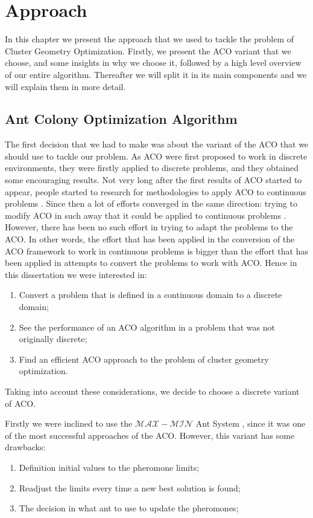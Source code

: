 \chapter{Approach}
\label{chap:approach}

In this chapter we present the approach that we used to tackle the problem of Cluster Geometry Optimization. Firstly, we present the ACO variant that we choose, and some insights in why we choose it, followed by a high level overview of our entire algorithm. Thereafter we will split it in its main components and we will explain them in more detail.


	\section{Ant Colony Optimization Algorithm}
	The first decision that we had to make was about the variant of the ACO that we should use to tackle our problem. As ACO were first proposed to work in discrete environments, they were firstly applied to discrete problems, and they obtained some encouraging results. Not very long after the first results of ACO started to appear, people started to research for methodologies to apply ACO to continuous problems \cite{bilchev95}. Since then a lot of efforts converged in the same direction: trying to modify ACO in such away that it could be applied to continuous problems \cite{bilchev95, kong06, tsutsui04}. However, there has been no such effort in trying to adapt the problems to the ACO. In other words, the effort that has been applied in the conversion of the ACO framework to work in continuous problems is bigger than the effort that has been applied in attempts to convert the problems to work with ACO. Hence in this dissertation we were interested in:
	\begin{enumerate}
		\item Convert a problem that is defined in a continuous domain to a discrete domain;
		\item See the performance of an ACO algorithm in a problem that was not originally discrete;
		\item Find an efficient ACO approach to the problem of cluster geometry optimization.
	\end{enumerate}
	Taking into account these considerations, we decide to choose a discrete variant of ACO. 

	Firstly we were inclined to use the $\mathcal{MAX}-\mathcal{MIN}$ Ant System \cite{stutzle00}, since it was one of the most successful approaches of the ACO.  However, this variant has some drawbacks:
	\begin{enumerate}
		\item Definition initial values to the pheromone limits;
		\item Readjust the limits every time a new best solution is found; 
		\item The decision in what ant to use to update the pheromones;
	\end{enumerate}
	
